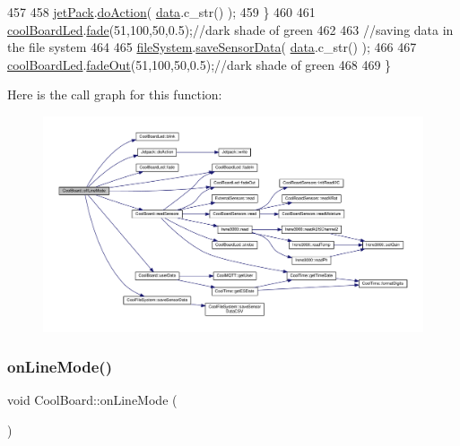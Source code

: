 \begin{DoxyCode}
457     
458         \hyperlink{classCoolBoard_a30b1357881b01ccbec676856a91e48e9}{jetPack}.\hyperlink{classJetpack_a9e703197093094b963f9ad57817495b8}{doAction}( \hyperlink{classCoolBoard_a427fb753dd8575bdf821c70a5c63d695}{data}.c\_str() );
459     \}
460     
461     \hyperlink{classCoolBoard_a1b1d3c684a5baa56b08486e192fd8e97}{coolBoardLed}.\hyperlink{classCoolBoardLed_af1cacbaa88db8bcf6042c1083ba41155}{fade}(51,100,50,0.5);\textcolor{comment}{//dark shade of green  }
462     
463     \textcolor{comment}{//saving data in the file system}
464     
465     \hyperlink{classCoolBoard_a42c2586fbb13ff7f06538e9284e8538d}{fileSystem}.\hyperlink{classCoolFileSystem_afa3a4feae94871d4d3b6bebb701c2e67}{saveSensorData}( \hyperlink{classCoolBoard_a427fb753dd8575bdf821c70a5c63d695}{data}.c\_str() );
466 
467     \hyperlink{classCoolBoard_a1b1d3c684a5baa56b08486e192fd8e97}{coolBoardLed}.\hyperlink{classCoolBoardLed_a93d545679237e8cc858324367149775c}{fadeOut}(51,100,50,0.5);\textcolor{comment}{//dark shade of green    }
468 
469 \}
\end{DoxyCode}
Here is the call graph for this function\+:\nopagebreak
\begin{figure}[H]
\begin{center}
\leavevmode
\includegraphics[width=350pt]{classCoolBoard_ae6b5e1274d760462290192acea4adca8_cgraph}
\end{center}
\end{figure}
\mbox{\label{classCoolBoard_aa0bbc4bc605e35618d18e68795c61363}} 
\subsubsection{\texorpdfstring{on\+Line\+Mode()}{onLineMode()}}
{\footnotesize\ttfamily void Cool\+Board\+::on\+Line\+Mode (\begin{DoxyParamCaption}{ }\end{DoxyParamCaption})}

